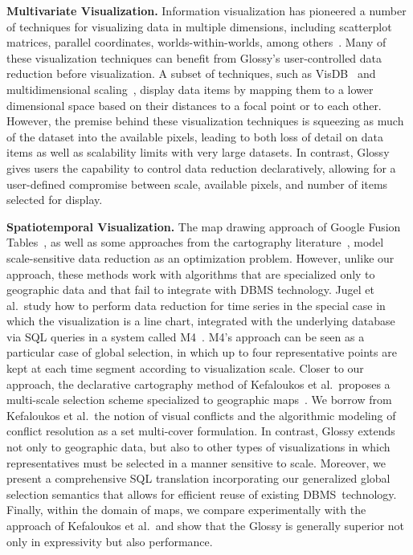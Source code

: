 \documentclass[11pt, oneside]{report}
\newcommand{\minisec}[1]{\noindent\textbf{#1.}}
\begin{document}
{\minisec{Multivariate Visualization}
Information visualization has pioneered a number of techniques for visualizing data in multiple dimensions, including scatterplot matrices, parallel coordinates, worlds-within-worlds, among others~\cite{card1999infovizbook,wong1994infovizsurvey}. Many of these visualization techniques can benefit from Glossy's user-controlled data reduction before visualization. A subset of techniques, such as VisDB~\cite{keim1995visdb} and multidimensional scaling~\cite{kruskal1978multidimensional}, display data items by mapping them to a lower dimensional space based on their distances to a focal point or to each other. However, the premise behind these visualization techniques is squeezing as much of the dataset into the available pixels, leading to both loss of detail on data items as well as scalability limits with very large datasets. In contrast, Glossy gives users the capability to control data reduction declaratively, allowing for a user-defined compromise between scale, available pixels, and number of items selected for display.   

\minisec{Spatiotemporal Visualization}
The map drawing approach of Google Fusion Tables~\cite{gonzalez2010fusiontables}, as well as some approaches from the cartography literature~\cite{neun2009mapgeneralization,ware2003generalization_sa}, model scale-sensitive data reduction as an optimization problem. However, unlike our approach, these methods work with algorithms that are specialized only to geographic data and that fail to integrate with DBMS technology. Jugel et al.~study how to perform data reduction for time series in the special case in which the visualization is a line chart, integrated with the underlying database via SQL queries in a system called M4~\cite{jugel2014m4}. M4's approach can be seen as a particular case of global selection, in which up to four representative points are kept at each time segment according to visualization scale. Closer to our approach, the declarative cartography method of Kefaloukos et al.~proposes a multi-scale selection scheme specialized to geographic maps~\cite{kefaloukos2014declarative}. We borrow from Kefaloukos et al.~the notion of visual conflicts and the algorithmic modeling of conflict resolution as a set multi-cover formulation. In contrast, Glossy extends not only to geographic data, but also to other types of visualizations in which representatives must be selected in a manner sensitive to scale. Moreover, we present a comprehensive SQL translation incorporating our generalized global selection semantics that allows for efficient reuse of existing DBMS~technology. Finally, within the domain of maps, we compare experimentally with the approach of Kefaloukos et al.~and show that the Glossy is generally superior not only in expressivity but also performance.    

}
\end{document}
